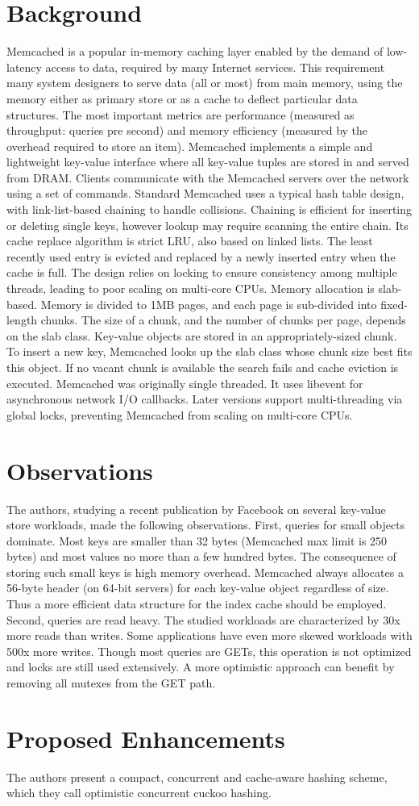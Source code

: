 \documentclass[letterpaper,twocolumn,10pt]{article}
\begin{document}
\section{Background}
Memcached is a popular in-memory caching layer enabled by the demand of low-latency access to data, required by many Internet services. This requirement many system designers to serve data (all or most) from main memory, using the memory either as primary store or as a cache to deflect particular data structures.
The most important metrics are performance (measured as throughput: queries pre second) and memory efficiency (measured by the overhead required to store an item).
Memcached implements a simple and lightweight key-value interface where all key-value tuples are stored in and served from DRAM. Clients communicate with the Memcached servers over the network using a set of commands.
Standard Memcached uses a typical hash table design, with link-list-based chaining to handle collisions. Chaining is efficient for inserting or deleting single keys, however lookup may require scanning the entire chain.
Its cache replace algorithm is strict LRU, also based on linked lists. The least recently used entry is evicted and replaced by a newly inserted entry when the cache is full. The design relies on locking to ensure consistency among multiple threads, leading to poor scaling on multi-core CPUs.
Memory allocation is slab-based. Memory is divided to 1MB pages, and each page is sub-divided into fixed-length chunks. The size of a chunk, and the number of chunks per page, depends on the slab class. Key-value objects are stored in an appropriately-sized chunk. To insert a new key, Memcached looks up the slab class whose chunk size best fits this object. If no vacant chunk is available the search fails and cache eviction is executed.
Memcached was originally single threaded. It uses libevent for asynchronous network I/O callbacks. Later versions support multi-threading via global locks, preventing Memcached from scaling on multi-core CPUs.

\section{Observations}
The authors, studying a recent publication by Facebook on several key-value store workloads, made the following observations.
First, queries for small objects dominate. Most keys are smaller than 32 bytes (Memcached max limit is 250 bytes) and most values no more than a few hundred bytes. The consequence of storing such small keys is high memory overhead. Memcached always allocates a 56-byte header (on 64-bit servers) for each key-value object regardless of size. Thus a more efficient data structure for the index cache should be employed.
Second, queries are read heavy. The studied workloads are characterized by 30x more reads than writes. Some applications have even more skewed workloads with 500x more writes. Though most queries are GETs, this operation is not optimized and locks are still used extensively. A more optimistic approach can benefit by removing all mutexes from the GET path.

\section{Proposed Enhancements}
The authors present a compact, concurrent and cache-aware hashing scheme, which they call optimistic concurrent cuckoo hashing.
{\footnotesize 
}


\theendnotes
\end{document}
